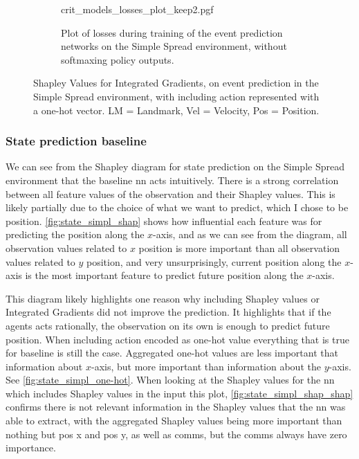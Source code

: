 \documentclass[UKenglish]{uiomasterthesis}
\begin{document}
\begin{figure}[H]
\begin{figure}[H]
    \centering
    {crit_models_losses_plot_keep2.pgf}
    \caption{Plot of losses during training of the event prediction networks on the Simple Spread environment, without softmaxing policy outputs.}
	\label{fig:crit_losses}
\end{figure}

\caption{Shapley Values for Integrated Gradients, on event prediction in the Simple Spread environment, with including action represented with a one-hot vector. LM = Landmark, Vel = Velocity, Pos = Position.}
\label{fig:event_simpl_one-hot_ig_slice}
\end{figure}

\subsubsection{State prediction baseline}
We can see from the Shapley diagram for state prediction on the Simple Spread environment that the baseline \ac{nn} acts intuitively. There is a strong correlation between all feature values of the observation and their Shapley values. This is likely partially due to the choice of what we want to predict, which I chose to be position. \cref{fig:state_simpl_shap} shows how influential each feature was for predicting the position along the $x$-axis, and as we can see from the diagram, all observation values related to $x$ position is more important than all observation values related to $y$ position, and very unsurprisingly, current position along the $x$-axis is the most important feature to predict future position along the $x$-axis.

This diagram likely highlights one reason why including Shapley values or Integrated Gradients did not improve the prediction. It highlights that if the agents acts rationally, the observation on its own is enough to predict future position. When including action encoded as one-hot value everything that is true for baseline is still the case. Aggregated one-hot values are less important that information about $x$-axis, but more important than information about the $y$-axis. See \cref{fig:state_simpl_one-hot}. When looking at the Shapley values for the \ac{nn} which includes Shapley values in the input this plot, \cref{fig:state_simpl_shap_shap} confirms there is not relevant information in the Shapley values that the \ac{nn} was able to extract, with the aggregated Shapley values being more important than nothing but pos x and pos y, as well as comms, but the comms always have zero importance.
\end{document}
